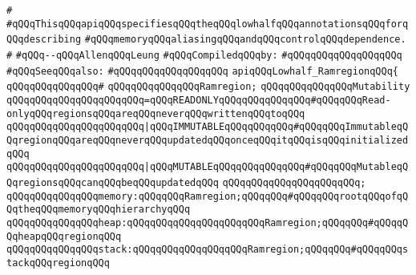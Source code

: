 \label{src/lib/compiler/back/low/aliasing/lowhalf-ramregion.api}
\verb|#|\newline
\verb|#qQQqThisqQQqapiqQQqspecifiesqQQqtheqQQqlowhalfqQQqannotationsqQQqforqQQqdescribing|\newline
\verb|#qQQqmemoryqQQqaliasingqQQqandqQQqcontrolqQQqdependence.|\newline
\verb|#|\newline
\verb|#qQQq--qQQqAllenqQQqLeung|\newline
\newline
\verb|#qQQqCompiledqQQqby:|\newline
\verb|#qQQqqQQqqQQqqQQqqQQq|\newline
\newline
\verb|#qQQqSeeqQQqalso:|\newline
\verb|#qQQqqQQqqQQqqQQqqQQq|\newline
\newline
\verb|apiqQQqLowhalf_RamregionqQQq{|\newline
\verb|qQQqqQQqqQQqqQQq#|\newline
\verb|qQQqqQQqqQQqqQQqRamregion;|\newline
\newline
\verb|qQQqqQQqqQQqqQQqMutability|\newline
\verb|qQQqqQQqqQQqqQQqqQQqqQQq=qQQqREADONLYqQQqqQQqqQQqqQQq#qQQqqQQqRead-onlyqQQqregionsqQQqareqQQqneverqQQqwrittenqQQqtoqQQq|\newline
\verb|qQQqqQQqqQQqqQQqqQQqqQQq|\verb#|qQQqIMMUTABLEqQQqqQQqqQQq#\verb|#qQQqqQQqImmutableqQQqregionqQQqareqQQqneverqQQqupdatedqQQqonceqQQqitqQQqisqQQqinitializedqQQq|\newline
\verb|qQQqqQQqqQQqqQQqqQQqqQQq|\verb#|qQQqMUTABLEqQQqqQQqqQQqqQQq#\verb|#qQQqqQQqMutableqQQqregionsqQQqcanqQQqbeqQQqupdatedqQQq|\newline
\verb|qQQqqQQqqQQqqQQqqQQqqQQq;|\newline
\newline
\verb|qQQqqQQqqQQqqQQqmemory:qQQqqQQqRamregion;qQQqqQQq#qQQqqQQqrootqQQqofqQQqtheqQQqmemoryqQQqhierarchyqQQq|\newline
\newline
\verb|qQQqqQQqqQQqqQQqheap:qQQqqQQqqQQqqQQqqQQqqQQqRamregion;qQQqqQQq#qQQqqQQqheapqQQqregionqQQq|\newline
\verb|qQQqqQQqqQQqqQQqstack:qQQqqQQqqQQqqQQqqQQqRamregion;qQQqqQQq#qQQqqQQqstackqQQqregionqQQq|\newline

